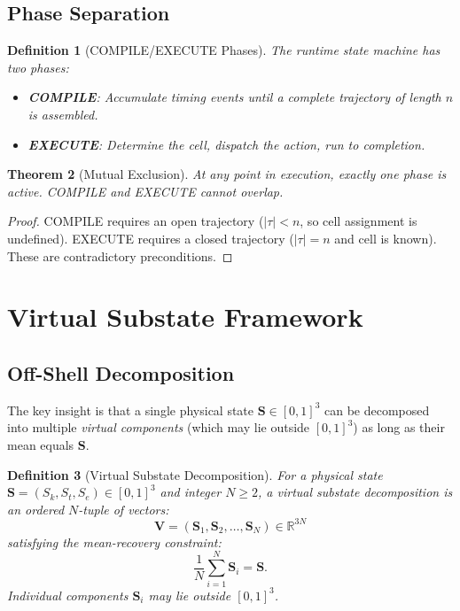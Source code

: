 \documentclass[twocolumn,11pt,a4paper]{article}
\newtheorem{theorem}{Theorem}[section]
\newtheorem{definition}[theorem]{Definition}
\newcommand{\Sk}{S_k}
\newcommand{\St}{S_t}
\newcommand{\Se}{S_e}
\newcommand{\Stuple}{\mathbf{S}}
\begin{document}
\subsection{Phase Separation}

\begin{definition}[COMPILE/EXECUTE Phases]
The runtime state machine has two phases:
\begin{itemize}[nosep,leftmargin=1em]
  \item \textbf{COMPILE}: Accumulate timing events until a complete trajectory of length $n$ is assembled.
  \item \textbf{EXECUTE}: Determine the cell, dispatch the action, run to completion.
\end{itemize}
\end{definition}

\begin{theorem}[Mutual Exclusion]
At any point in execution, exactly one phase is active. COMPILE and EXECUTE cannot overlap.
\end{theorem}

\begin{proof}
COMPILE requires an open trajectory ($|\tau| < n$, so cell assignment is undefined). EXECUTE requires a closed trajectory ($|\tau| = n$ and cell is known). These are contradictory preconditions.
\end{proof}

\section{Virtual Substate Framework}
\label{sec:virtual}

\subsection{Off-Shell Decomposition}

The key insight is that a single physical state $\Stuple \in [0,1]^3$ can be decomposed into multiple \emph{virtual components} (which may lie outside $[0,1]^3$) as long as their mean equals $\Stuple$.

\begin{definition}[Virtual Substate Decomposition]
For a physical state $\Stuple = (\Sk, \St, \Se) \in [0,1]^3$ and integer $N \geq 2$, a \emph{virtual substate decomposition} is an ordered $N$-tuple of vectors:
\begin{equation}
  \mathbf{V} = (\Stuple_1, \Stuple_2, \ldots, \Stuple_N) \in \mathbb{R}^{3N}
\end{equation}
satisfying the \emph{mean-recovery constraint}:
\begin{equation}
  \frac{1}{N}\sum_{i=1}^{N} \Stuple_i = \Stuple.
  \label{eq:mean-recovery}
\end{equation}
Individual components $\Stuple_i$ may lie outside $[0,1]^3$.
\end{definition}
\end{document}
